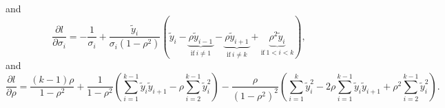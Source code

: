 \documentclass{article}
\begin{document}
%
and
%
\begin{equation}
  \frac{\partial l}{\partial \sigma_i} = - \frac{1}{\sigma_i} + \frac{\tilde{y}_i}{\sigma_i(1-\rho^2)}
  \left( \tilde{y}_i
         - \underbrace{\rho\tilde{y}_{i-1}}_{\text{if} \: i \neq 1}
         - \underbrace{\rho\tilde{y}_{i+1}}_{\text{if} \: i \neq k}
         + \underbrace{\rho^2\tilde{y}_i}_{\text{if} \: 1 < i < k}
  \right),
\end{equation}
%
and
%
\begin{equation}
  \frac{\partial l}{\partial \rho}
  = \frac{(k-1)\rho}{1-\rho^2}
  + \frac{1}{1-\rho^2} \left( \sum_{i=1}^{k-1} \tilde{y}_i \tilde{y}_{i+1} - \rho \sum_{i=2}^{k-1} \tilde{y}_i^2  \right)
  - \frac{\rho}{(1-\rho^2)^2} \left( \sum_{i=1}^{k} \tilde{y}_i^2 - 2\rho \sum_{i=1}^{k-1} \tilde{y}_i \tilde{y}_{i+1} + \rho^2 \sum_{i=2}^{k-1} \tilde{y}_i^2 \right).
\end{equation}
\end{document}
